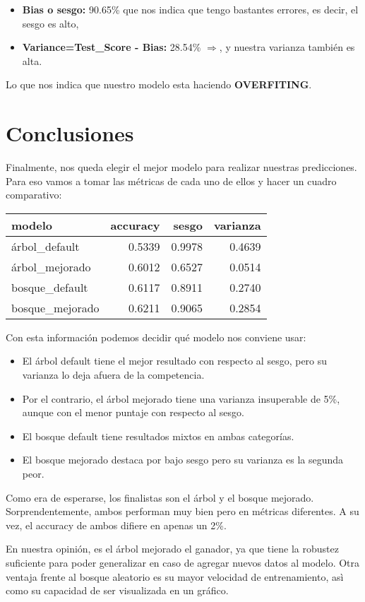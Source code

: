 \documentclass[a4paper]{article}
\begin{document}
            \begin{itemize}
                \item \textbf{Bias o sesgo:} 90.65\% que nos indica que tengo bastantes errores, es decir, el sesgo es alto,
                \item \textbf{Variance=Test\_Score - Bias:} 28.54\% $\Rightarrow$, y nuestra varianza también es alta. 
            \end{itemize} 

            Lo que nos indica que nuestro modelo esta haciendo \textbf{OVERFITING}.

\newpage

\section{Conclusiones}

    Finalmente, nos queda elegir el mejor modelo para realizar nuestras predicciones. Para eso vamos a tomar las métricas de cada uno de ellos y hacer un cuadro comparativo:
    
    \begin{table}[H]
        \centering
        \begin{tabular}{|l|r|r|r|}
        \hline
            modelo & accuracy & sesgo & varianza \\ \hline
            árbol\_default & 0.5339 & 0.9978 & 0.4639 \\ \hline
            árbol\_mejorado & 0.6012 & 0.6527 & 0.0514 \\ \hline
            bosque\_default & 0.6117 & 0.8911 & 0.2740 \\ \hline
            bosque\_mejorado & 0.6211 & 0.9065 & 0.2854 \\ \hline
        \end{tabular}
    \end{table}

    Con esta información podemos decidir qué modelo nos conviene usar:
    \begin{itemize}
        \item El árbol default tiene el mejor resultado con respecto al sesgo, pero su varianza lo deja afuera de la competencia.
        \item Por el contrario, el árbol mejorado tiene una varianza insuperable de 5\%, aunque con el menor puntaje con respecto al sesgo.
        \item El bosque default tiene resultados mixtos en ambas categorías.
        \item El bosque mejorado destaca por bajo sesgo pero su varianza es la segunda peor.
    \end{itemize}
    Como era de esperarse, los finalistas son el árbol y el bosque mejorado. Sorprendentemente, ambos performan muy bien pero en métricas diferentes. A su vez, el accuracy de ambos difiere en apenas un 2\%.

    En nuestra opinión, es el árbol mejorado el ganador, ya que tiene la robustez suficiente para poder generalizar en caso de agregar nuevos datos al modelo. Otra ventaja frente al bosque aleatorio es su mayor velocidad de entrenamiento, asì como su capacidad de ser visualizada en un gráfico.
        
\end{document}
